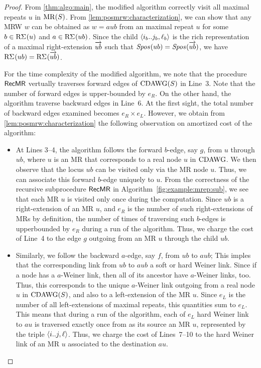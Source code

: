 \begin{proof}
  From \cref{thm:algo:main}, the modified algorithm correctly visit all maximal repeats $u$ in $\MR(S)$. From \cref{lem:posmrw:characterization},
we can show that any MRW $w$ can be obtained as $w = aub$ from an maximal repeat $u$ for some $b \in \RSigma[](u)$ and $a \in \RSigma[](ub)$. Since the child $\pair{i_b..j_b, \ell_b}$ is the rich representation of a maximal right-extension $\rext{ub}$ such that $\Spos[](ub) = \Spos[](\rext{ub})$, we have $\RSigma[](ub) = \RSigma[](\rext{ub})$. 

For the time complexity of the modified algorithm, we note that the procedure $\MRRec$ vertually traverses forward edges of $\CDAWG(S)$ in Line~3.
Note that the number of forward edges is upper-bounded by $e_R$.
On the other hand, the algorithm traverse backward edges in Line~6. At the first sight, the total number of backward edges examined becomes $e_R\times e_L$. However, we obtain from \cref{lem:posmrw:characterization} the following observation on amortized cost of the algorithm: 
\begin{itemize}
\item At Lines 3--4, the algorithm follows the forward $b$-edge, say $g$, from $u$ through $ub$, where $u$ is an MR that corresponds to a real node $u$ in $\CDAWG$. We then observe that the locus $ub$ can be visited only via the MR node $u$. Thus, we can associate this forward $b$-edge uniquely to $u$. From the correctness of the recursive subprocedure $\MRRec$ in Algorithm~\ref{fig:example:mrep:sub}, we see that each MR $u$ is visited only once during the computation. Since $ub$ is a right-extension of an MR $u$, and $e_R$ is the number of such right-extensions of MRs by definition, the number of times of traversing such $b$-edges is upperbounded by $e_R$ during a run of the algorithm. Thus, we charge the cost of Line~4 to the edge $g$ outgoing from an MR $u$ through the child $ub$. 
  
\item Similarly, we follow the backward $a$-edge, say $f$, from $ub$ to $aub$; This imples that the corresponding link from $ub$ to $aub$ a soft or hard Weiner link. Since if a node has a $a$-Weiner link, then all of its ancestor have $a$-Weiner links, too. Thus, this corresponds to the unique $a$-Weiner link outgoing from a real node $u$ in $\CDAWG(S)$, and also to a left-extension of the MR $u$. Since $e_L$ is the number of all left-extensions of maximal repeats, this quantities sum to $e_L$.
  This means that during a run of the algorithm, each of $e_L$ hard Weiner link to $au$ is traversed exactly once from as its source an MR $u$, represented by the triple $\pair{i..j, \ell}$. Thus, we charge the cost of Lines~7--10 to the hard Weiner link of an MR $u$ associated to the destination $au$. 
\end{itemize}


\end{proof}
